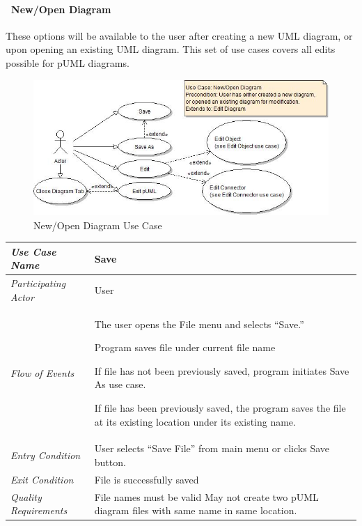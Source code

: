 \documentclass[twoside,letterpaper]{article}
\newenvironment{my_enumerate}{
\begin{enumerate}
  \setlength{\itemsep}{1pt}
  \setlength{\parskip}{0pt}
  \setlength{\parsep}{0pt}}{\end{enumerate}
}
\begin{document}
\clearpage


\paragraph[\ New/Open Diagram]
{\ New/Open Diagram} {These options will be available to the user after creating a new UML diagram, or upon opening an existing UML diagram. This set of use cases covers all edits possible for pUML diagrams.}

\begin{figure}[h]
\centering
\includegraphics[width=6.0in]{ucaseNewOpenDiagram.jpg}
\caption{New/Open Diagram Use Case}
\end{figure}

\begin{flushleft}
\tablehead{}
\begin{tabular}{|m{2.0in} m{5.0in}|}
\hline
{\bfseries\emph{Use Case Name}}
& {\bfseries Save}
\\\hline
\emph{Participating Actor}
& User
\\\hline
\emph{Flow of Events}
& \begin{my_enumerate}
  \item The user opens the File menu and selects ``Save.''
  \item Program saves file under current file name 
\begin{my_enumerate}
\item If file has not been previously saved, program initiates Save As use case. 
\item If file has been previously saved, the program saves the file at its existing location under its existing name.
\end{my_enumerate}
\end{my_enumerate}
\\\hline
\emph{Entry Condition}
& User selects ``Save File'' from main menu or clicks Save button.
\\\hline
\emph{Exit Condition}
& File is successfully saved
\\\hline
\emph{Quality Requirements}
& File names must be valid \newline
  May not create two pUML diagram files with same name in same location.
\\\hline
\end{tabular}
\end{flushleft}
\bigskip
\end{document}
